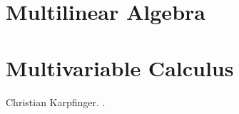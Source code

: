 \documentclass[12pt]{book}  %
\begin{document}
\chapter{Multilinear Algebra}

% 
%
%

\chapter{Multivariable Calculus}
 
 
 

% 
% 
% 


\begin{thebibliography}{10}
Christian Karpfinger. .
\end{thebibliography}	

 
  

\begin{comment}


\end{comment} 
	
\end{document}
